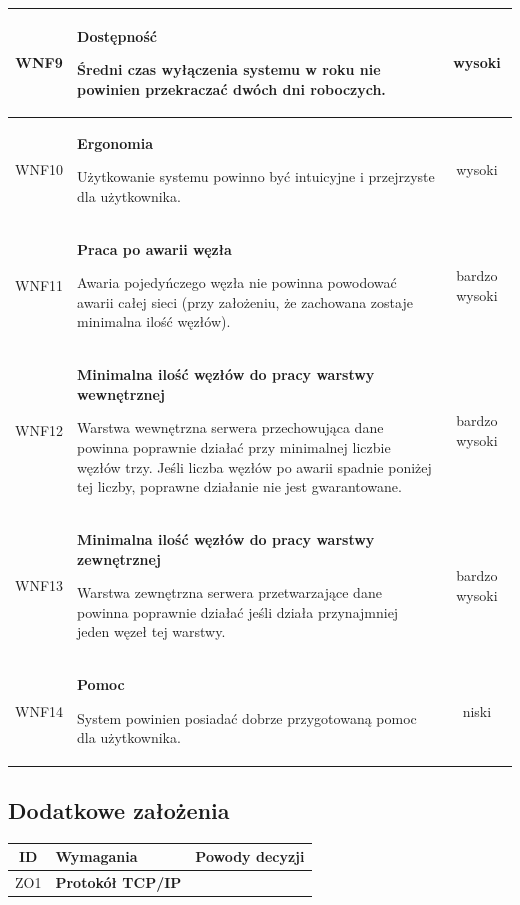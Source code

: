{\begin{tabularx}{\textwidth}{|c|X|c|}
\label{z:WNF9} WNF9 & \textbf{Dostępność} 
 
Średni czas wyłączenia systemu w roku nie powinien przekraczać dwóch dni roboczych.
 & wysoki\\
\hline

\label{z:WNF10} WNF10 & \textbf{Ergonomia} 
 
Użytkowanie systemu powinno być intuicyjne i przejrzyste dla użytkownika.
 & wysoki\\
\hline

\label{z:WNF11} WNF11 & \textbf{Praca po awarii węzła} 
 
Awaria pojedyńczego węzła nie powinna powodować awarii całej sieci (przy założeniu, że zachowana zostaje minimalna ilość węzłów).
 & bardzo wysoki\\
\hline

\label{z:WNF12} WNF12 & \textbf{Minimalna ilość węzłów do pracy warstwy wewnętrznej} 
 
Warstwa wewnętrzna serwera przechowująca dane powinna poprawnie działać przy minimalnej liczbie węzłów trzy. Jeśli liczba węzłów po awarii spadnie poniżej tej liczby, poprawne działanie nie jest gwarantowane.
 & bardzo wysoki\\
\hline

\label{z:WNF13} WNF13 & \textbf{Minimalna ilość węzłów do pracy warstwy zewnętrznej} 
 
Warstwa zewnętrzna serwera przetwarzające dane powinna poprawnie działać jeśli działa przynajmniej jeden węzeł tej warstwy.
 & bardzo wysoki\\
\hline

\label{z:WNF14} WNF14 & \textbf{Pomoc} 
 
System powinien posiadać dobrze przygotowaną pomoc dla użytkownika.
 & niski \\
\hline

\end{tabularx}


\subsection[Dodatkowe założenia]{Dodatkowe założenia}

\begin{tabularx}{\textwidth}{|c|X|X|}
\hline
\textbf{ID} & \textbf{Wymagania}  & \textbf{Powody decyzji} \\
\hline

\label{z:ZO1} ZO1 &  \textbf{Protokół TCP/IP }


\end{tabularx}}
